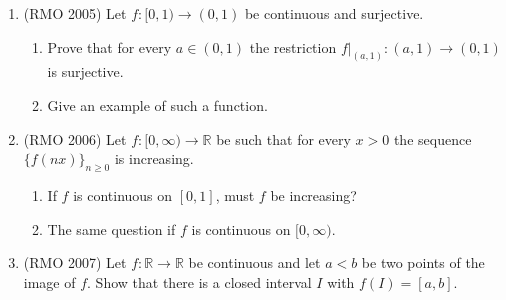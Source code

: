 \documentclass[11pt,a4paper]{article}
\renewcommand{\ge}{\geqslant}
\begin{document}
\begin{enumerate}
\item (RMO 2005) Let $f\colon[0,1)\to(0,1)$ be continuous and surjective.
\begin{enumerate}[label=\alph*)]
\item Prove that for every $a\in(0,1)$ the restriction $f|_{(a,1)}\colon(a,1)\to(0,1)$ is surjective.
\item Give an example of such a function.
\end{enumerate}

\item (RMO 2006) Let $f\colon[0,\infty)\to\mathbb R$ be such that for every $x>0$ the sequence
$\{f(nx)\}_{n\ge0}$ is increasing.
\begin{enumerate}[label=\alph*)]
\item If $f$ is continuous on $[0,1]$, must $f$ be increasing?
\item The same question if $f$ is continuous on $[0,\infty)$.
\end{enumerate}

\item (RMO 2007) Let $f\colon\mathbb R\to\mathbb R$ be continuous and let $a<b$ be two points of the
image of $f$. Show that there is a closed interval $I$ with $f(I)=[a,b]$.
\end{enumerate}
\end{document}
